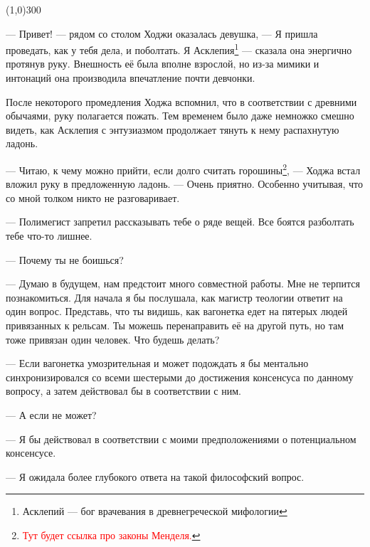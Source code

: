 \documentclass[12pt,a4paper]{article}
\newcommand{\tr}[1]{\textcolor{red}{#1}}
\newcommand{\sep}{
	\begin{center}
		\line(1,0){300}
	\end{center}
}
\begin{document}



\sep

--- Привет! --- рядом со столом Ходжи оказалась девушка, --- Я пришла проведать, как у тебя дела, и поболтать. Я Асклепия\footnote{Асклепий --- бог врачевания в древнегреческой мифологии} --- сказала она энергично протянув руку. Внешность её была вполне взрослой, но из-за мимики и интонаций она производила впечатление почти девчонки.

После некоторого промедления Ходжа вспомнил, что в соответствии с древними обычаями, руку полагается пожать. Тем временем было даже немножко смешно видеть, как Асклепия с энтузиазмом продолжает тянуть к нему распахнутую ладонь.

--- Читаю, к чему можно прийти, если долго считать горошины\footnote{\tr{Тут будет ссылка про законы Менделя.}}, --- Ходжа встал вложил руку в предложенную ладонь. --- Очень приятно. Особенно учитывая, что со мной толком никто не разговаривает.

--- Полимегист запретил рассказывать тебе о ряде вещей. Все боятся разболтать тебе что-то лишнее.

--- Почему ты не боишься?

--- Думаю в будущем, нам предстоит много совместной работы. Мне не терпится познакомиться. Для начала я бы послушала, как магистр теологии ответит на один вопрос.  Представь, что ты видишь, как вагонетка едет на пятерых людей привязанных к рельсам. Ты можешь перенаправить её на другой путь, но там тоже привязан один человек. Что будешь делать?

--- Если вагонетка умозрительная и может подождать я бы ментально синхронизировался со всеми шестерыми до достижения консенсуса по данному вопросу, а затем действовал бы в соответствии с ним.

--- А если не может?

--- Я бы действовал в соответствии с моими предположениями о потенциальном консенсусе.


--- Я ожидала более глубокого ответа на такой философский вопрос.
\end{document}
